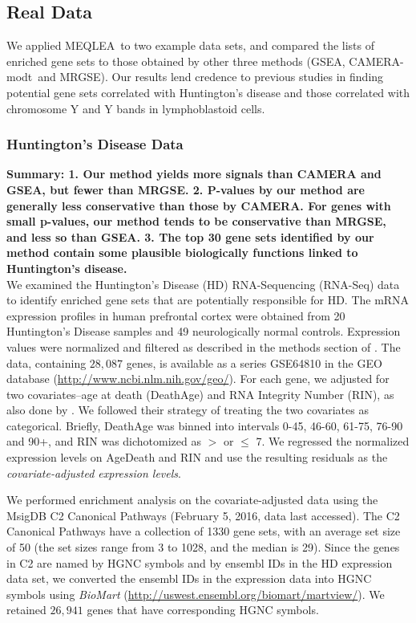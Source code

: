 \documentclass[a4,center,fleqn]{NAR}
\newcommand{\OurMethod}{MEQLEA}
\newcommand{\CMT}{CAMERA-modt}
\newcommand{\genr}{MRGSE}
\begin{document}
	\subsection{Real Data}\label{section:realdata}
	We applied \OurMethod~to two example data sets, and compared the lists of enriched gene sets to those
	obtained by other three methods (GSEA, \CMT~and \genr). %
	Our results lend credence to previous studies in finding potential gene sets correlated with
	Huntington's disease and those correlated with chromosome Y and Y bands in lymphoblastoid cells.  
	
	\subsubsection{Huntington's Disease Data}
	\textbf{Summary: 1. Our method yields more signals than CAMERA and GSEA, but fewer than MRGSE. 2. P-values by our method are generally less conservative than those by CAMERA. For genes with small p-values, our method tends to be conservative than MRGSE, and less so than GSEA. 3. The top 30 gene sets identified by our method contain some plausible biologically functions linked to Huntington's disease.}\\
	
	We examined the Huntington's Disease (HD) RNA-Sequencing (RNA-Seq) data \citep{labadorf2015rna}  to
	identify enriched gene sets that are potentially responsible for HD. The mRNA expression 
	profiles in human
	prefrontal cortex were obtained from 20 Huntington's Disease samples and 49 neurologically normal
	controls.  Expression values were normalized and filtered as described in the methods section of
	\citet{labadorf2015rna}.	The data, containing $28,087$ genes, is available as a series GSE64810 in the GEO database (\url{http://www.ncbi.nlm.nih.gov/geo/}). 
	For each gene, we adjusted for two covariates--age at death (DeathAge) and RNA Integrity Number (RIN), as also done by \citet{labadorf2015rna}. We followed their strategy of treating the two
	covariates as categorical. Briefly, DeathAge was binned into intervals 0-45, 46-60, 61-75, 76-90 and
	90+,  and RIN was dichotomized as  $>$ or $\leq$ 7. We regressed the normalized expression levels on 
	AgeDeath and RIN and use the resulting residuals as the \textit{covariate-adjusted expression levels}.
	
	We performed enrichment analysis on the covariate-adjusted data using the MsigDB
	\citep{subramanian2005gene} C2 Canonical Pathways (February 5, 2016, data last accessed).
	The C2 Canonical Pathways have a collection of 1330 gene sets, with an average set size of
	50 (the set sizes range from 3 to 1028, and the median is 29). Since the genes in C2 are named by
	HGNC symbols and by ensembl IDs in the HD expression data set, we converted the ensembl IDs in the
	expression data into HGNC symbols using \textit{BioMart}
	(\url{http://uswest.ensembl.org/biomart/martview/}). We retained $26,941$ genes that have
	corresponding HGNC symbols. 
	
\end{document}
